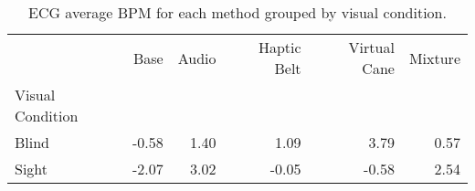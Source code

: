 
\begin{table}[!htb]
\centering
\caption{ECG average BPM for each method grouped by visual condition.}
\label{tab:bpm_average_group}
\begin{tabular}{lrrrrr}
\toprule
{} &   Base & Audio & Haptic Belt & Virtual Cane & Mixture \\
Visual Condition &        &       &             &              &         \\
\midrule
Blind            &  -0.58 &  1.40 &        1.09 &         3.79 &    0.57 \\
Sight            &  -2.07 &  3.02 &       -0.05 &        -0.58 &    2.54 \\
\bottomrule
\end{tabular}
\end{table}

